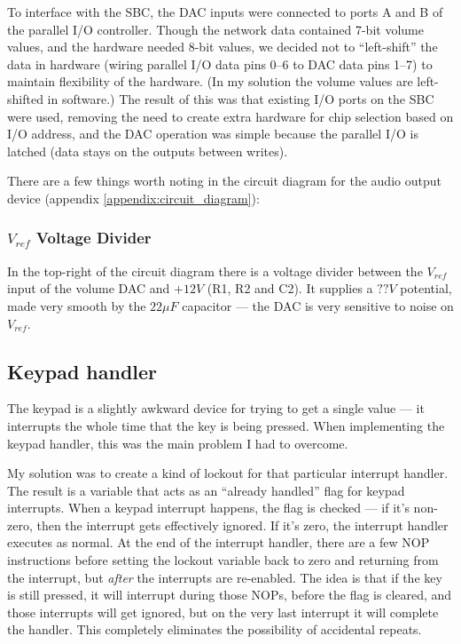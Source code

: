 To interface with the SBC, the DAC inputs were connected to ports A and B of the parallel I/O 
controller.  Though the network data contained 7-bit volume values, and the hardware needed 8-bit 
values, we decided not to ``left-shift'' the data in hardware (wiring parallel I/O data pins 0--6 to 
DAC data pins 1--7) to maintain flexibility of the hardware.  (In my solution the volume values are 
left-shifted in software.)  The result of this was that existing I/O ports on the SBC were used, 
removing the need to create extra hardware for chip selection based on I/O address, and the DAC 
operation was simple because the parallel I/O is latched (data stays on the outputs between writes).

There are a few things worth noting in the circuit diagram for the audio output device (appendix 
\ref{appendix:circuit_diagram}):

\subsubsection{$V_{ref}$ Voltage Divider}

In the top-right of the circuit diagram there is a voltage divider between the $V_{ref}$ input of 
the volume DAC and $+12V$ (R1, R2 and C2).  It supplies a $??V$ potential, made very smooth by the 
$22\mu{}F$ capacitor --- the DAC is very sensitive to noise on $V_{ref}$.

\subsection{Keypad handler}
\label{sec:design:keypad_handler}

The keypad is a slightly awkward device for trying to get a single value --- it interrupts the whole 
time that the key is being pressed.  When implementing the keypad handler, this was the main problem 
I had to overcome.

My solution was to create a kind of lockout for that particular interrupt handler.  The result is a 
variable that acts as an ``already handled'' flag for keypad interrupts.  When a keypad interrupt 
happens, the flag is checked --- if it's non-zero, then the interrupt gets effectively ignored.  If 
it's zero, the interrupt handler executes as normal.  At the end of the interrupt handler, there are 
a few NOP instructions before setting the lockout variable back to zero and returning from the 
interrupt, but \emph{after} the interrupts are re-enabled.  The idea is that if the key is still 
pressed, it will interrupt during those NOPs, before the flag is cleared, and those interrupts will 
get ignored, but on the very last interrupt it will complete the handler.  This completely 
eliminates the possibility of accidental repeats.

